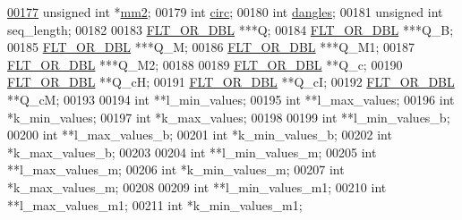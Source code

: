 \begin{DoxyCode}
\hypertarget{2Dpfold_8h_source.tex_l00177}{}\hyperlink{structTwoDpfold__vars_affb913470783f9edb12a0bfc22466269}{00177}   \textcolor{keywordtype}{unsigned} \textcolor{keywordtype}{int}    *\hyperlink{structTwoDpfold__vars_affb913470783f9edb12a0bfc22466269}{mm2};           
00179   \textcolor{keywordtype}{int}             \hyperlink{group__model__details_gaf9202a1a09f5828dc731e2d9a10fa111}{circ};
00180   \textcolor{keywordtype}{int}             \hyperlink{group__model__details_ga72b511ed1201f7e23ec437e468790d74}{dangles};
00181   \textcolor{keywordtype}{unsigned} \textcolor{keywordtype}{int}    seq\_length;
00182 
00183   \hyperlink{group__data__structures_ga31125aeace516926bf7f251f759b6126}{FLT\_OR\_DBL}      ***Q;
00184   \hyperlink{group__data__structures_ga31125aeace516926bf7f251f759b6126}{FLT\_OR\_DBL}      ***Q\_B;
00185   \hyperlink{group__data__structures_ga31125aeace516926bf7f251f759b6126}{FLT\_OR\_DBL}      ***Q\_M;
00186   \hyperlink{group__data__structures_ga31125aeace516926bf7f251f759b6126}{FLT\_OR\_DBL}      ***Q\_M1;
00187   \hyperlink{group__data__structures_ga31125aeace516926bf7f251f759b6126}{FLT\_OR\_DBL}      ***Q\_M2;
00188 
00189   \hyperlink{group__data__structures_ga31125aeace516926bf7f251f759b6126}{FLT\_OR\_DBL}      **Q\_c;
00190   \hyperlink{group__data__structures_ga31125aeace516926bf7f251f759b6126}{FLT\_OR\_DBL}      **Q\_cH;
00191   \hyperlink{group__data__structures_ga31125aeace516926bf7f251f759b6126}{FLT\_OR\_DBL}      **Q\_cI;
00192   \hyperlink{group__data__structures_ga31125aeace516926bf7f251f759b6126}{FLT\_OR\_DBL}      **Q\_cM;
00193 
00194   \textcolor{keywordtype}{int}             **l\_min\_values;
00195   \textcolor{keywordtype}{int}             **l\_max\_values;
00196   \textcolor{keywordtype}{int}             *k\_min\_values;
00197   \textcolor{keywordtype}{int}             *k\_max\_values;
00198 
00199   \textcolor{keywordtype}{int}             **l\_min\_values\_b;
00200   \textcolor{keywordtype}{int}             **l\_max\_values\_b;
00201   \textcolor{keywordtype}{int}             *k\_min\_values\_b;
00202   \textcolor{keywordtype}{int}             *k\_max\_values\_b;
00203 
00204   \textcolor{keywordtype}{int}             **l\_min\_values\_m;
00205   \textcolor{keywordtype}{int}             **l\_max\_values\_m;
00206   \textcolor{keywordtype}{int}             *k\_min\_values\_m;
00207   \textcolor{keywordtype}{int}             *k\_max\_values\_m;
00208 
00209   \textcolor{keywordtype}{int}             **l\_min\_values\_m1;
00210   \textcolor{keywordtype}{int}             **l\_max\_values\_m1;
00211   \textcolor{keywordtype}{int}             *k\_min\_values\_m1;

\end{DoxyCode}
